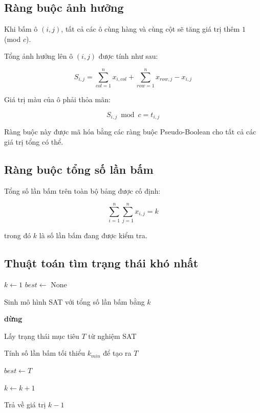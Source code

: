 \subsection{Ràng buộc ảnh hưởng}

Khi bấm ô $(i,j)$, tất cả các ô cùng hàng và cùng cột sẽ
tăng giá trị thêm $1$ (mod $c$).

Tổng ảnh hưởng lên ô $(i,j)$ được tính như sau:

\[
S_{i,j} =
\sum_{col=1}^{n} x_{i,col}
+
\sum_{row=1}^{n} x_{row,j}
-
x_{i,j}
\]

Giá trị màu của ô phải thỏa mãn:

\[
S_{i,j} \bmod c = t_{i,j}
\]

Ràng buộc này được mã hóa bằng các ràng buộc
Pseudo-Boolean cho tất cả các giá trị tổng có thể.

\subsection{Ràng buộc tổng số lần bấm}

Tổng số lần bấm trên toàn bộ bảng được cố định:

\[
\sum_{i=1}^{n} \sum_{j=1}^{n} x_{i,j} = k
\]

trong đó $k$ là số lần bấm đang được kiểm tra.

\subsection{Thuật toán tìm trạng thái khó nhất}

\begin{algorithm}
\caption{Tìm trạng thái Alien Tiles khó nhất}
\begin{algorithmic}[1]

\State $k \gets 1$
\State $best \gets$ None


    \State Sinh mô hình SAT với tổng số lần bấm bằng $k$

        \State \textbf{dừng}
    \EndIf

    \State Lấy trạng thái mục tiêu $T$ từ nghiệm SAT

    \State Tính số lần bấm tối thiểu $k_{min}$ để tạo ra $T$

        \State $best \gets T$
    \EndIf

    \State $k \gets k + 1$

\EndWhile

\State Trả về giá trị $k-1$

\end{algorithmic}
\end{algorithm}


